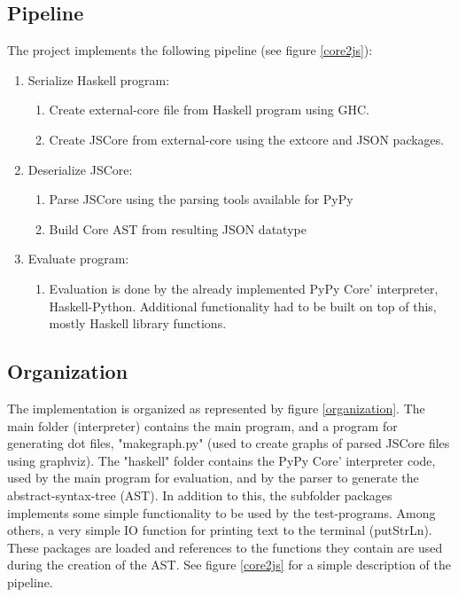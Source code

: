 \subsection{Pipeline}

The project implements the following pipeline (see figure \ref{core2js}):
\begin{enumerate}
\item Serialize Haskell program: 
  \begin{enumerate}
  \item Create external-core file from Haskell program using GHC.
  \item Create JSCore from external-core using the extcore and JSON packages.
  \end{enumerate}
\item Deserialize JSCore:
  \begin{enumerate}
  \item Parse JSCore using the parsing tools available for PyPy
  \item Build Core AST from resulting JSON datatype
  \end{enumerate}
\item Evaluate program:
  \begin{enumerate}
  \item Evaluation is done by the already implemented PyPy Core' interpreter,
  Haskell-Python. Additional functionality had to be built on top of this, mostly 
  Haskell library functions.
  \end {enumerate}
\end{enumerate}

\subsection{Organization}

The implementation is organized as represented by figure \ref{organization}. The
main folder (interpreter) contains the main program, and a program for generating
dot files, "makegraph.py" (used to create graphs of parsed JSCore files using graphviz). 
The "haskell" folder
contains the PyPy Core' interpreter code, used by the main program for evaluation, 
and by the parser to generate the abstract-syntax-tree (AST). In addition to this,
the subfolder packages implements some simple functionality to be used by the test-programs.
Among others, a very simple IO function for printing text to the terminal (putStrLn).
These packages are loaded and references to the functions they contain are used during
the creation of the AST. See figure \ref{core2js} for a simple description of the pipeline.

